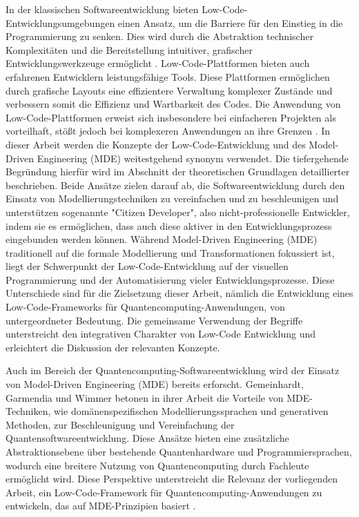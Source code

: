 In der klassischen Softwareentwicklung bieten Low-Code-Entwicklungsumgebungen einen Ansatz, 
um die Barriere für den Einstieg in die Programmierung zu senken. Dies wird durch die 
Abstraktion technischer Komplexitäten und die Bereitstellung intuitiver, grafischer 
Entwicklungswerkzeuge ermöglicht \cite{Juhas2022}. Low-Code-Plattformen bieten auch 
erfahrenen Entwicklern leistungsfähige Tools. 
Diese Plattformen ermöglichen durch grafische Layouts eine effizientere Verwaltung komplexer 
Zustände und verbessern somit die Effizienz und Wartbarkeit des Codes. Die
Anwendung von Low-Code-Plattformen erweist sich insbesondere bei
einfacheren Projekten als vorteilhaft, stößt jedoch bei komplexeren
Anwendungen an ihre Grenzen \cite{Buscher2022}. 
In dieser Arbeit werden die Konzepte der Low-Code-Entwicklung und des Model-Driven Engineering (MDE) 
weitestgehend synonym verwendet. Die tiefergehende Begründung hierfür 
wird im Abschnitt der theoretischen Grundlagen detaillierter beschrieben. 
Beide Ansätze zielen darauf ab, die Softwareentwicklung durch 
den Einsatz von Modellierungstechniken zu vereinfachen und zu beschleunigen und 
unterstützen sogenannte "Citizen Developer", also nicht-professionelle Entwickler, 
indem sie es ermöglichen, dass auch diese aktiver in den Entwicklungsprozess eingebunden werden können.
Während Model-Driven Engineering (MDE) traditionell auf die formale Modellierung und 
Transformationen fokussiert ist, liegt der Schwerpunkt der Low-Code-Entwicklung auf der 
visuellen Programmierung und der Automatisierung vieler Entwicklungsprozesse. 
Diese Unterschiede sind für die Zielsetzung dieser Arbeit, nämlich die Entwicklung eines 
Low-Code-Frameworks für Quantencomputing-Anwendungen, von untergeordneter Bedeutung. 
Die gemeinsame Verwendung der Begriffe unterstreicht den integrativen Charakter 
von Low-Code Entwicklung und erleichtert die Diskussion der relevanten Konzepte. 


Auch im Bereich der Quantencomputing-Softwareentwicklung wird der Einsatz von 
Model-Driven Engineering (MDE) bereits erforscht. Gemeinhardt, Garmendia und Wimmer \cite{gemeinhardt_2021} 
betonen in ihrer Arbeit die Vorteile von MDE-Techniken, wie domänenspezifischen 
Modellierungssprachen und generativen Methoden, zur Beschleunigung und Vereinfachung 
der Quantensoftwareentwicklung. Diese Ansätze bieten eine zusätzliche Abstraktionsebene 
über bestehende Quantenhardware und Programmiersprachen, wodurch eine breitere Nutzung 
von Quantencomputing durch Fachleute ermöglicht wird. Diese Perspektive unterstreicht 
die Relevanz der vorliegenden Arbeit, ein Low-Code-Framework für Quantencomputing-Anwendungen 
zu entwickeln, das auf MDE-Prinzipien basiert \cite{gemeinhardt_2021}.

